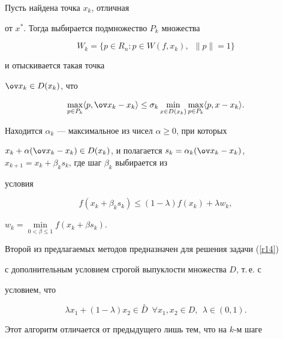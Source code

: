 Пусть найдена точка $x_k$, отличная


от $x^*$. Тогда выбирается подмножество $P_k$ множества


$$


W_k=\{p\in R_n: p\in W(f,x_k),\ \; \|p\|=1\}


$$


и отыскивается такая точка


$\ov x_k\in D(x_k)$, что




\begin{equation} \label{r15}


\max_{p\in P_k} \la p, \ov x_k -x_k \ra 


\le \sigma_k \min_{x\in D(x_k)} \max_{p\in P_k}


\la p, x -x_k \ra .


\end{equation}


%


Находится $\alpha_k$ --- максимальное из чисел $\alpha \ge 0$, при которых


$x_k + \alpha (\ov x_k -x_k)\in D(x_k)$, и полагается $s_k=\alpha_k(\ov


x_k-x_k)$, $x_{k+1}=x_k+ \beta_k s_k$, где шаг $\beta_k$ выбирается из


условия




\begin{equation} \label{r16}


f(x_k+\beta_k s_k)\le (1-\lambda)f(x_k) + \lambda w_k,


\end{equation}


%


$w_k=\min \limits_{0<\beta \le 1} f(x_k +\beta s_k)$.





Второй из предлагаемых методов предназначен для решения задачи (\ref{r14})


с дополнительным условием строгой выпуклости множества $D$, т.\,е. с


условием, что


$$


\lambda x_1+ (1- \lambda) x_2 \in \overset{\circ}{D}{}


\ \; \forall x_1, x_2\in D,\ \  \lambda \in (0,1).


$$


Этот алгоритм отличается от предыдущего лишь тем, что на $k$-м шаге


